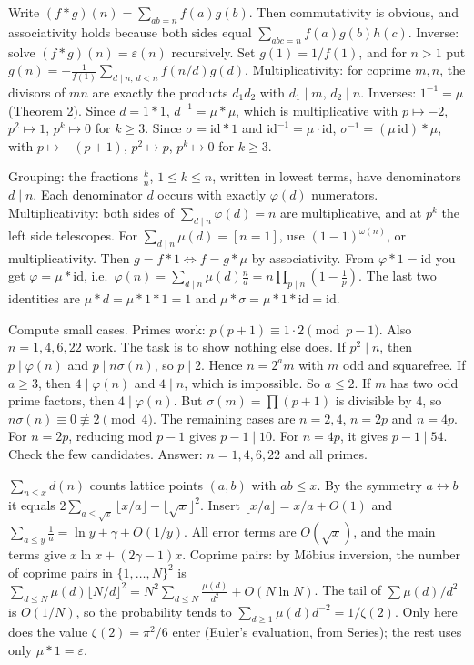 \documentclass[11pt,a4paper]{article}
\begin{document}

 Write $(f*g)(n)=\sum_{ab=n}f(a)g(b)$. Then commutativity is obvious, and associativity holds because both sides equal $\sum_{abc=n}f(a)g(b)h(c)$.
 Inverse: solve $(f*g)(n)=\varepsilon(n)$ recursively. Set $g(1)=1/f(1)$, and for $n>1$ put $g(n)=-\frac1{f(1)}\sum_{d\mid n,\,d<n}f(n/d)g(d)$. Multiplicativity: for coprime $m,n$, the divisors of $mn$ are exactly the products $d_1d_2$ with $d_1\mid m$, $d_2\mid n$.
 Inverses: $1^{-1}=\mu$ (Theorem 2). Since $d=1*1$, $d^{-1}=\mu*\mu$, which is multiplicative with $p\mapsto-2$, $p^2\mapsto1$, $p^k\mapsto0$ for $k\ge3$. Since $\sigma=\mathrm{id}*1$ and $\mathrm{id}^{-1}=\mu\cdot\mathrm{id}$, $\sigma^{-1}=(\mu\,\mathrm{id})*\mu$, with $p\mapsto-(p+1)$, $p^2\mapsto p$, $p^k\mapsto0$ for $k\ge3$.

 Grouping: the fractions $\frac kn$, $1\le k\le n$, written in lowest terms, have denominators $d\mid n$. Each denominator $d$ occurs with exactly $\varphi(d)$ numerators. Multiplicativity: both sides of $\sum_{d\mid n}\varphi(d)=n$ are multiplicative, and at $p^k$ the left side telescopes.
 For $\sum_{d\mid n}\mu(d)=[n=1]$, use $(1-1)^{\omega(n)}$, or multiplicativity. Then $g=f*1\iff f=g*\mu$ by associativity. From $\varphi*1=\mathrm{id}$ you get $\varphi=\mu*\mathrm{id}$, i.e.\ $\varphi(n)=\sum_{d\mid n}\mu(d)\frac nd=n\prod_{p\mid n}(1-\frac1p)$.
 The last two identities are $\mu*d=\mu*1*1=1$ and $\mu*\sigma=\mu*1*\mathrm{id}=\mathrm{id}$.

 Compute small cases. Primes work: $p(p+1)\equiv1\cdot2\pmod{p-1}$. Also $n=1,4,6,22$ work. The task is to show nothing else does.
 If $p^2\mid n$, then $p\mid\varphi(n)$ and $p\mid n\sigma(n)$, so $p\mid2$. Hence $n=2^a m$ with $m$ odd and squarefree. If $a\ge3$, then $4\mid\varphi(n)$ and $4\mid n$, which is impossible. So $a\le2$.
 If $m$ has two odd prime factors, then $4\mid\varphi(n)$. But $\sigma(m)=\prod(p+1)$ is divisible by $4$, so $n\sigma(n)\equiv0\not\equiv2\pmod4$.
 The remaining cases are $n=2,4$, $n=2p$ and $n=4p$. For $n=2p$, reducing mod $p-1$ gives $p-1\mid10$. For $n=4p$, it gives $p-1\mid54$. Check the few candidates. Answer: $n=1,4,6,22$ and all primes.

 $\sum_{n\le x}d(n)$ counts lattice points $(a,b)$ with $ab\le x$. By the symmetry $a\leftrightarrow b$ it equals $2\sum_{a\le\sqrt x}\lfloor x/a\rfloor-\lfloor\sqrt x\rfloor^2$.
 Insert $\lfloor x/a\rfloor=x/a+O(1)$ and $\sum_{a\le y}\frac1a=\ln y+\gamma+O(1/y)$. All error terms are $O(\sqrt x)$, and the main terms give $x\ln x+(2\gamma-1)x$.
 Coprime pairs: by Möbius inversion, the number of coprime pairs in $\{1,\dots,N\}^2$ is $\sum_{d\le N}\mu(d)\lfloor N/d\rfloor^2=N^2\sum_{d\le N}\frac{\mu(d)}{d^2}+O(N\ln N)$.
 The tail of $\sum\mu(d)/d^2$ is $O(1/N)$, so the probability tends to $\sum_{d\ge1}\mu(d)d^{-2}=1/\zeta(2)$. Only here does the value $\zeta(2)=\pi^2/6$ enter (Euler's evaluation, from Series); the rest uses only $\mu*1=\varepsilon$.
\end{document}
